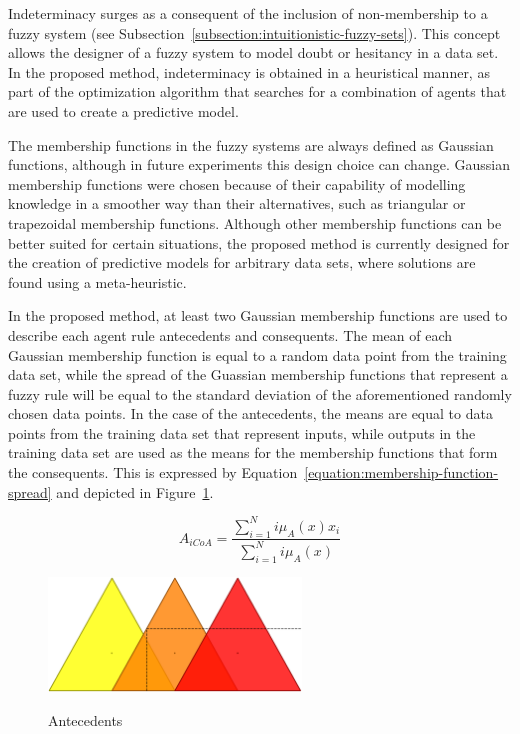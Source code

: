 \documentclass[review]{elsarticle}
\begin{document}
Indeterminacy surges as a consequent of the inclusion of non-membership to a
fuzzy system (see Subsection~\ref{subsection:intuitionistic-fuzzy-sets}). This
concept allows the designer of a fuzzy system to model doubt or hesitancy in a
data set. In the proposed method, indeterminacy is obtained in a heuristical
manner, as part of the optimization algorithm that searches for a combination of
agents that are used to create a predictive model.

The membership functions in the fuzzy systems are always defined as Gaussian
functions, although in future experiments this design choice can
change. Gaussian membership functions were chosen because of their capability of
modelling knowledge in a smoother way than their alternatives, such as
triangular or trapezoidal membership functions. Although other membership
functions can be better suited for certain situations, the proposed method is
currently designed for the creation of predictive models for arbitrary data sets,
where solutions are found using a meta-heuristic.



In the proposed method, at least two Gaussian membership functions are used to
describe each agent rule antecedents and consequents. The mean of each Gaussian
membership function is equal to a random data point from the training data set,
while the spread of the Guassian membership functions that represent a fuzzy
rule will be equal to the standard deviation of the aforementioned randomly
chosen data points. In the case of the antecedents, the means are equal to data
points from the training data set that represent inputs, while outputs in the
training data set are used as the means for the membership functions that form
the consequents. This is expressed by
Equation~\ref{equation:membership-function-spread} and depicted in
Figure~\ref{figure:fuzzy-system-architecture}.

\begin{equation}
  \label{equation:membership-function-spread}
  A_{iCoA} = \dfrac{\sum_{i=1}^{N} i\mu_{A}(x) x_{i}}{\sum_{i=1}^{N}
    i\mu_{A}(x)}
\end{equation}

\begin{figure}
  \caption{Antecedents}
  \centering
  \includegraphics[width=0.6\textwidth]{img/antecedents.png}
  \label{figure:fuzzy-system-architecture}
\end{figure}
\end{document}
